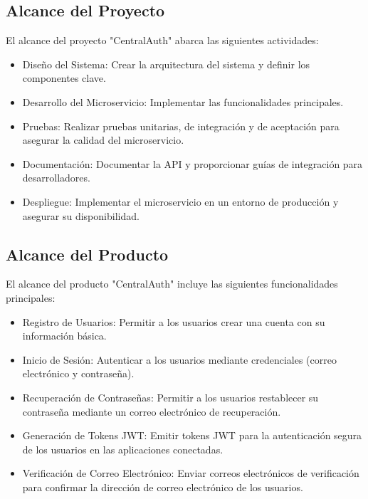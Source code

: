 \subsection{Alcance del Proyecto}

El alcance del proyecto "CentralAuth" abarca las siguientes actividades:
\begin{itemize}
    \item Diseño del Sistema: Crear la arquitectura del sistema y definir los componentes clave.
    \item Desarrollo del Microservicio: Implementar las funcionalidades principales.
    \item Pruebas: Realizar pruebas unitarias, de integración y de aceptación para asegurar la calidad del microservicio.
    \item Documentación: Documentar la API y proporcionar guías de integración para desarrolladores.
    \item Despliegue: Implementar el microservicio en un entorno de producción y asegurar su disponibilidad.
\end{itemize}

\subsection{Alcance del Producto}

El alcance del producto "CentralAuth" incluye las siguientes funcionalidades principales:
\begin{itemize}
    \item Registro de Usuarios: Permitir a los usuarios crear una cuenta con su información básica.
    \item Inicio de Sesión: Autenticar a los usuarios mediante credenciales (correo electrónico y contraseña).
    \item Recuperación de Contraseñas: Permitir a los usuarios restablecer su contraseña mediante un correo electrónico de recuperación.
    \item Generación de Tokens JWT: Emitir tokens JWT para la autenticación segura de los usuarios en las aplicaciones conectadas.
    \item Verificación de Correo Electrónico: Enviar correos electrónicos de verificación para confirmar la dirección de correo electrónico de los usuarios.
\end{itemize}

